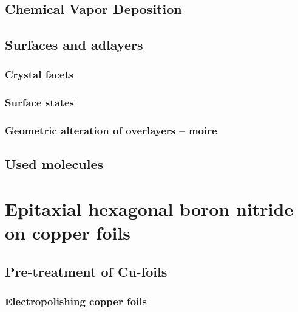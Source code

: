 \documentclass[10pt,a4paper,twoside
,BCOR=8mm				%
]{scrbook}
\begin{document}
  \section{\textbf{C}hemical \textbf{V}apor \textbf{D}eposition}
        
  \section{Surfaces and adlayers}
     \subsection{Crystal facets}
        
     \subsection{Surface states}
	
     \subsection{Geometric alteration of overlayers -- moire}
	
  \section{Used molecules}
    
\printbibliography

\chapter{Epitaxial hexagonal boron nitride on copper foils}
\section{Pre-treatment of Cu-foils}
  \subsection{Electropolishing copper foils}
  
%      
%      
\end{document}

